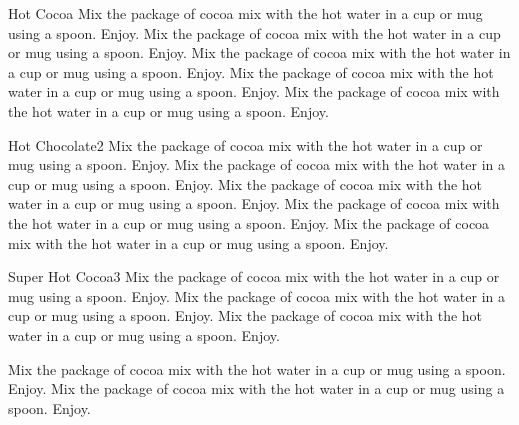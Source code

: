\documentclass{recipecard}
\begin{document}
 
 
\begin{recipe}{Hot Cocoa}{}
Mix the package of cocoa mix with the hot water in a cup or mug
using a spoon. Enjoy. Mix the package of cocoa mix with the hot
water in a cup or mug using a spoon. Enjoy. Mix the package of cocoa
mix with the hot water in a cup or mug using a spoon. Enjoy. Mix the
package of cocoa mix with the hot water in a cup or mug using a
spoon. Enjoy. Mix the package of cocoa mix with the hot water in a
cup or mug using a spoon. Enjoy.
\end{recipe}

       
\begin{recipe}{Hot Chocolate}{2}
Mix the package of cocoa mix with the hot water in a cup or mug
using a spoon. Enjoy. Mix the package of cocoa mix with the hot
water in a cup or mug using a spoon. Enjoy. Mix the package of cocoa
mix with the hot water in a cup or mug using a spoon. Enjoy. Mix the
package of cocoa mix with the hot water in a cup or mug using a
spoon. Enjoy. Mix the package of cocoa mix with the hot water in a
cup or mug using a spoon. Enjoy.
\end{recipe}

 
 
 
\begin{recipe}{Super Hot Cocoa}{3}
Mix the package of cocoa mix with the hot water in a cup or mug
using a spoon. Enjoy. Mix the package of cocoa mix with the hot
water in a cup or mug using a spoon. Enjoy. Mix the package of cocoa
mix with the hot water in a cup or mug using a spoon. Enjoy.

Mix the package of cocoa mix with the hot water in a cup or mug
using a spoon. Enjoy. Mix the package of cocoa mix with the hot
water in a cup or mug using a spoon. Enjoy. 
\end{recipe}
\end{document}

